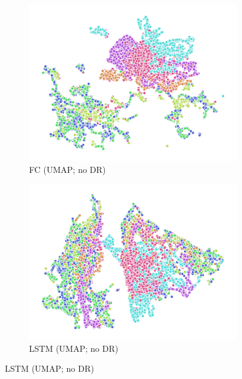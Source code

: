 \begin{figure}
\begin{subfigure}{0.22\textwidth}
    \includegraphics[width=\textwidth]{figures/chapter6/embeddings/jaco_no-DR_prop_fc1_UMAP.png}
    \caption{FC (UMAP; no DR)}
  \end{subfigure}
  \begin{subfigure}{0.22\textwidth}
    \includegraphics[width=\textwidth]{figures/chapter6/embeddings/jaco_no-DR_prop_h_UMAP.png}
    \caption{LSTM (UMAP; no DR)}
  \end{subfigure}


\end{figure}

